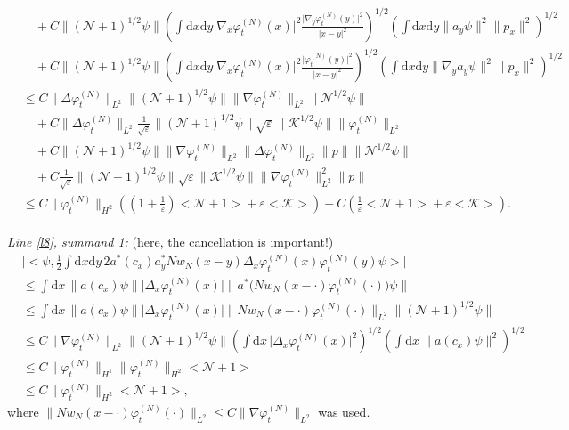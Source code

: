 \documentclass[11pt,a4paper,draft,DIV11]{scrartcl}	%
\newcommand{\di}{\textrm{d}}		%
\newcommand{\Ncal}{\mathcal{N}}		%
\newcommand{\Kcal}{\mathcal{K}}		%
\newcommand{\estlist}[2]{\emph{\vspace{.3em}\\Line \ref{l#1}, summand #2:}}
\newcommand{\scal}[2]{\big<#1,#2\big>} %
\newcommand{\norm}[1]{\lVert#1\rVert}	%
\newcommand{\ev}[1]{\big<#1\big>}	%
\newcommand{\ph}{\varphi_t^{(N)}}	%
\begin{document}
\begin{fleqn}[0.5em]
\begin{align*}
& \quad + C \norm{(\Ncal+1)^{1/2}\psi} \left(\int \di x\di y \lvert \nabla_x\ph(x)\rvert^2 \frac{\lvert\nabla_y \ph(y)\rvert^2}{\lvert x-y \rvert^2} \right)^{1/2} \left(\int \di x\di y \norm{a_y \psi}^2 \norm{p_x}^2 \right)^{1/2} \\
& \quad + C \norm{(\Ncal+1)^{1/2}\psi} \left(\int \di x\di y \lvert \nabla_x\ph(x)\rvert^2 \frac{\lvert \ph(y)\rvert^2}{\lvert x-y\rvert^2} \right)^{1/2} \left(\int \di x\di y \norm{\nabla_y a_y\psi}^2 \norm{p_x}^2 \right)^{1/2} \\
& \leq C \norm{\Delta \ph}_{L^2} \norm{(\Ncal+1)^{1/2}\psi} \norm{\nabla \ph}_{L^2} \norm{\Ncal^{1/2}\psi} \\
& \quad + C\norm{\Delta \ph}_{L^2} \frac{1}{\sqrt{\varepsilon}} \norm{(\Ncal+1)^{1/2}\psi}  \sqrt{\varepsilon}\norm{\Kcal^{1/2}\psi} \norm{\ph}_{L^2} \\
& \quad + C \norm{(\Ncal+1)^{1/2}\psi} \norm{\nabla \ph}_{L^2} \norm{\Delta \ph}_{L^2} \norm{p} \norm{\Ncal^{1/2}\psi} \\
& \quad + C \frac{1}{\sqrt{\varepsilon}}\norm{(\Ncal+1)^{1/2}\psi} \sqrt{\varepsilon}\norm{\Kcal^{1/2}\psi} \norm{\nabla \ph}_{L^2}^2 \norm{p} \\
& \leq C \norm{\ph}_{H^2} \left( (1+\frac{1}{\varepsilon})\ev{\Ncal+1} + \varepsilon\ev{\Kcal} \right) + C \left( \frac{1}{\varepsilon}\ev{\Ncal+1} + \varepsilon \ev{\Kcal} \right).
\end{align*}
\estlist{8}{1} (here, the cancellation is important!)
\begin{align*}
&\lvert \scal{\psi}{\frac{1}{2}\int \di x\di y\, 2a^\ast(c_x) a^\ast_y N w_N(x-y) \Delta_x \ph(x) \ph(y) \psi}\rvert\\
& \leq \int \di x\, \norm{a(c_x)\psi} \lvert \Delta_x \ph(x)\rvert \norm{a^\ast\big(Nw_N(x-\cdot)\ph(\cdot)\big)\psi} \\
& \leq \int \di x\, \norm{a(c_x)\psi} \lvert \Delta_x \ph(x)\rvert \norm{N w_N(x-\cdot)\ph(\cdot)}_{L^2} \norm{(\Ncal+1)^{1/2}\psi} \\
& \leq C \norm{\nabla\ph}_{L^2} \norm{(\Ncal+1)^{1/2} \psi} \left( \int \di x\, \lvert \Delta_x \ph(x)\rvert^2 \right)^{1/2} \left( \int \di x\, \norm{a(c_x)\psi}^2 \right)^{1/2} \\
& \leq C \norm{\ph}_{H^1} \norm{\ph}_{H^2} \ev{\Ncal+1} \\
& \leq C \norm{\ph}_{H^2} \ev{\Ncal+1},
\end{align*}
where $\norm{Nw_N(x-\cdot)\ph(\cdot)}_{L^2} \leq C\norm{\nabla \ph}_{L^2}$ was used.\\

\end{fleqn}
\end{document}
